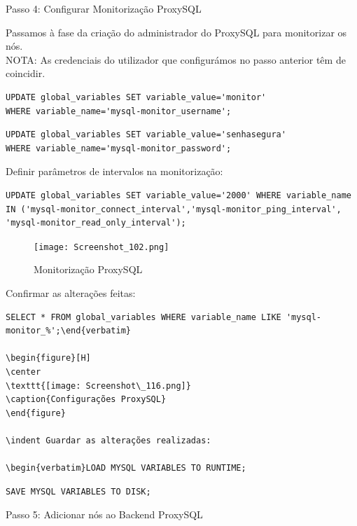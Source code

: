 \hfill \break
\indent Passo 4: Configurar Monitorização ProxySQL

\hfill \break
\indent Passamos à fase da criação do administrador do ProxySQL para monitorizar os nós.\\
NOTA: As credenciais do utilizador que configurámos no passo anterior têm de coincidir.

\begin{verbatim}
UPDATE global_variables SET variable_value='monitor' 
WHERE variable_name='mysql-monitor_username';  
\end{verbatim}

\begin{verbatim}UPDATE global_variables SET variable_value='senhasegura' 
WHERE variable_name='mysql-monitor_password';\end{verbatim}

\newpage
Definir parâmetros de intervalos na monitorização:

\begin{verbatim}UPDATE global_variables SET variable_value='2000' WHERE variable_name 
IN ('mysql-monitor_connect_interval','mysql-monitor_ping_interval',
'mysql-monitor_read_only_interval');\end{verbatim}

\begin{figure}[H]
\center
\texttt{[image: Screenshot\_102.png]}
\caption{Monitorização ProxySQL}
\end{figure}

Confirmar as alterações feitas:

\begin{verbatim}SELECT * FROM global_variables WHERE variable_name LIKE 'mysql-monitor_%';\end{verbatim}

\begin{figure}[H]
\center
\texttt{[image: Screenshot\_116.png]}
\caption{Configurações ProxySQL}
\end{figure}

\indent Guardar as alterações realizadas:

\begin{verbatim}LOAD MYSQL VARIABLES TO RUNTIME;\end{verbatim}
\begin{verbatim}SAVE MYSQL VARIABLES TO DISK;\end{verbatim}

\newpage
Passo 5: Adicionar nós ao Backend ProxySQL\\

